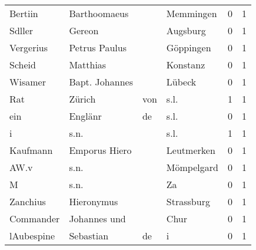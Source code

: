 \documentclass[10pt,a4paper,landscape]{article}
\begin{document}
\begin{longtable}{llllrr}
                  Bertiin &                       Barthoomaeus &             &                                   Memmingen &          0 &         1 \\
                   Sdller &                             Gereon &             &                                    Augsburg &          0 &         1 \\
                Vergerius &                      Petrus Paulus &             &                                   Göppingen &          0 &         1 \\
                   Scheid &                           Matthias &             &                                    Konstanz &          0 &         1 \\
                  Wisamer &                     Bapt. Johannes &             &                                      Lübeck &          0 &         1 \\
                      Rat &                             Zürich &         von &                                        s.l. &          1 &         1 \\
                      ein &                            Englänr &          de &                                        s.l. &          0 &         1 \\
                        i &                               s.n. &             &                                        s.l. &          1 &         1 \\
                 Kaufmann &                      Emporus Hiero &             &                                  Leutmerken &          0 &         1 \\
                     AW.v &                               s.n. &             &                                  Mömpelgard &          0 &         1 \\
                        M &                               s.n. &             &                                          Za &          0 &         1 \\
                 Zanchius &                         Hieronymus &             &                                  Strassburg &          0 &         1 \\
                Commander &                       Johannes und &             &                                        Chur &          0 &         1 \\
               lAubespine &                          Sebastian &          de &                                           i &          0 &         1 \\

\end{longtable}
\end{document}
